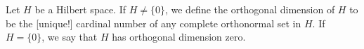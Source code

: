 Let $H$ be a Hilbert space. If $H \neq \{0\}$, we define the orthogonal dimension of $H$ to be the [unique!] cardinal number of any complete orthonormal set in $H$. If $H = \{0\}$, we say that $H$ has orthogonal dimension zero.